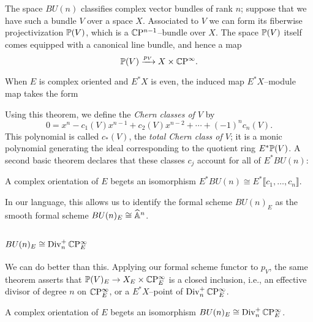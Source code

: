 The space $BU(n)$ classifies complex vector bundles of rank $n$; suppose that we have such a bundle $V$ over a space $X$.  Associated to $V$ we can form its fiberwise projectivization $\P(V)$, which is a $\CP^{n-1}$--bundle over $X$.  The space $\P(V)$ itself comes equipped with a canonical line bundle, and hence a map \[\P(V) \xrightarrow{p_V} X \times \CP^\infty.\]

\begin{theorem}
When $E$ is complex oriented and $E^* X$ is even, the induced map $E^* X$--module map takes the form
\begin{center}
\end{center}
\end{theorem}

\noindent Using this theorem, we define the \emph{Chern classes of $V$} by \[0 = x^n - c_1(V) x^{n-1} + c_2(V) x^{n-2} + \cdots + (-1)^n c_n(V).\]  This polynomial is called $c_*(V)$, the \emph{total Chern class of $V$}; it is a monic polynomial generating the ideal corresponding to the quotient ring $E^* \P(V)$.  A second basic theorem declares that these classes $c_j$ account for all of $E^* BU(n)$:

\begin{theorem}
A complex orientation of $E$ begets an isomorphism $E^* BU(n) \cong E^*\llbracket c_1, \ldots, c_n \rrbracket$.
\end{theorem}

\noindent In our language, this allows us to identify the formal scheme $BU(n)_E$ as the smooth formal scheme $BU(n)_E \cong \A^n$.


\subsection*{$BU(n)_E \cong \Div_n^+ \CP^\infty_E$}

We can do better than this.  Applying our formal scheme functor to $p_V$, the same theorem asserts that $\P(V)_E \to X_E \times \CP^\infty_E$ is a closed inclusion, i.e., an effective divisor of degree $n$ on $\CP^\infty_E$, or a $E^* X$--point of $\Div_n^+ \CP^\infty_E$.

\begin{theorem}
A complex orientation of $E$ begets an isomorphism $BU(n)_E \cong \Div_n^+ \CP^\infty_E$.
\end{theorem}


